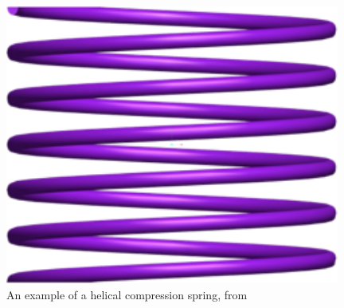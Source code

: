\documentclass[10pt]{article}
\begin{document}
		\begin{figure}[h]
		 \begin{center}\includegraphics[scale=.2]{Spring.png}\end{center}
		 \caption{An example of a helical compression spring, from \cite{Massad2015}}
		 \label{Spring}
		 
		 \end{figure}
\end{document}
